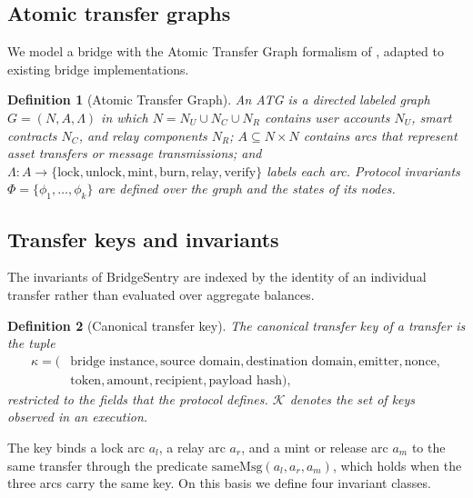 \documentclass[a4paper]{cas-sc}
\newtheorem{definition}{Definition}
\begin{document}
\subsection{Atomic transfer graphs}

We model a bridge with the Atomic Transfer Graph formalism of \citet{dubler2025atg}, adapted to existing bridge implementations.

\begin{definition}[Atomic Transfer Graph]\label{def:atg}
An ATG is a directed labeled graph $G = (N, A, \Lambda)$ in which $N = N_U \cup N_C \cup N_R$ contains user accounts $N_U$, smart contracts $N_C$, and relay components $N_R$; $A \subseteq N \times N$ contains arcs that represent asset transfers or message transmissions; and $\Lambda: A \rightarrow \{\text{lock}, \text{unlock}, \text{mint}, \text{burn}, \text{relay}, \text{verify}\}$ labels each arc. Protocol invariants $\Phi = \{\phi_1, \ldots, \phi_k\}$ are defined over the graph and the states of its nodes.
\end{definition}

\subsection{Transfer keys and invariants}

The invariants of BridgeSentry are indexed by the identity of an individual transfer rather than evaluated over aggregate balances.

\begin{definition}[Canonical transfer key]\label{def:key}
The canonical transfer key of a transfer is the tuple
\begin{equation*}
\begin{aligned}
\kappa = (&\text{bridge instance}, \text{source domain}, \text{destination domain}, \text{emitter}, \text{nonce},\\
&\text{token}, \text{amount}, \text{recipient}, \text{payload hash}),
\end{aligned}
\end{equation*}
restricted to the fields that the protocol defines. $\mathcal{K}$ denotes the set of keys observed in an execution.
\end{definition}

The key binds a lock arc $a_l$, a relay arc $a_r$, and a mint or release arc $a_m$ to the same transfer through the predicate $\text{sameMsg}(a_l, a_r, a_m)$, which holds when the three arcs carry the same key. On this basis we define four invariant classes.
\end{document}
